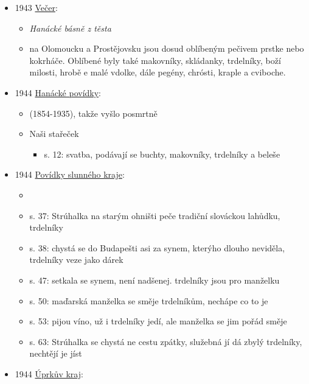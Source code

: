 \begin{itemize}
  \begin{itemize}
  \tightlist
  \item
    román, Stanislav Kovanda
  \item
    po svatbě posílají výslužku příbuzným, koš plný koláčů, koblih,
    božích milostí a trdelníků
  \end{itemize}
\item
  1943
  \href{https://www.digitalniknihovna.cz/mzk/uuid/uuid:16efdbd0-9611-11ea-8d7c-005056825209}{Večer}:

  \begin{itemize}
  \tightlist
  \item
    \emph{Hanácké básně z těsta}
  \item
    na Olomoucku a Prostějovsku jsou dosud oblíbeným pečivem prstke nebo
    kokrháče. Oblíbené byly také makovníky, skládanky, trdelníky, boží
    milosti, hrobě e malé vdolke, dále pegény, chrósti, kraple a
    cviboche.
  \end{itemize}
\item
  1944
  \href{https://ceskadigitalniknihovna.cz/uuid/uuid:bca2a111-2a25-42f8-b998-2567d7c7e193}{Hanácké
  povídky}:

  \begin{itemize}
  \tightlist
  \item
     (1854-1935), takže vyšlo posmrtně
  \item
    Naši stařeček

    \begin{itemize}
    \tightlist
    \item
      s. 12: svatba, podávají se buchty, makovníky, trdelníky a beleše
    \end{itemize}
  \end{itemize}
\item
  1944
  \href{https://ceskadigitalniknihovna.cz/uuid/uuid:78576090-e45a-11e5-8d5f-005056827e51}{Povídky
  slunného kraje}:

  \begin{itemize}
  \tightlist
  \item
  \item
    s. 37: Strúhalka na starým ohništi peče tradiční slováckou lahůdku,
    trdelníky
  \item
    s. 38: chystá se do Budapešti asi za synem, kterýho dlouho neviděla,
    trdelníky veze jako dárek
  \item
    s. 47: setkala se synem, není nadšenej. trdelníky jsou pro manželku
  \item
    s. 50: maďarská manželka se směje trdelníkům, nechápe co to je
  \item
    s. 53: pijou víno, už i trdelníky jedí, ale manželka se jim pořád
    směje
  \item
    s. 63: Strúhalka se chystá ne cestu zpátky, služebná jí dá zbylý
    trdelníky, nechtějí je jíst
  \end{itemize}
\item
  1944
  \href{https://ceskadigitalniknihovna.cz/uuid/uuid:5750c939-5b86-4edc-ac0c-0823eb9ecbba}{Úprkův
  kraj}:


\end{itemize}

